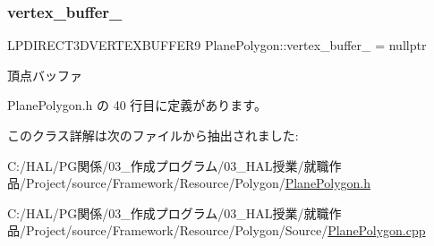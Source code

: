 \subsubsection{\texorpdfstring{vertex\+\_\+buffer\+\_\+}{vertex\_buffer\_}}
{\footnotesize\ttfamily L\+P\+D\+I\+R\+E\+C\+T3\+D\+V\+E\+R\+T\+E\+X\+B\+U\+F\+F\+E\+R9 Plane\+Polygon\+::vertex\+\_\+buffer\+\_\+ = nullptr\hspace{0.3cm}{\ttfamily [private]}}



頂点バッファ 



 Plane\+Polygon.\+h の 40 行目に定義があります。



このクラス詳解は次のファイルから抽出されました\+:\begin{DoxyCompactItemize}
\item 
C\+:/\+H\+A\+L/\+P\+G関係/03\+\_\+作成プログラム/03\+\_\+\+H\+A\+L授業/就職作品/\+Project/source/\+Framework/\+Resource/\+Polygon/\mbox{\hyperlink{_plane_polygon_8h}{Plane\+Polygon.\+h}}\item 
C\+:/\+H\+A\+L/\+P\+G関係/03\+\_\+作成プログラム/03\+\_\+\+H\+A\+L授業/就職作品/\+Project/source/\+Framework/\+Resource/\+Polygon/\+Source/\mbox{\hyperlink{_plane_polygon_8cpp}{Plane\+Polygon.\+cpp}}\end{DoxyCompactItemize}
